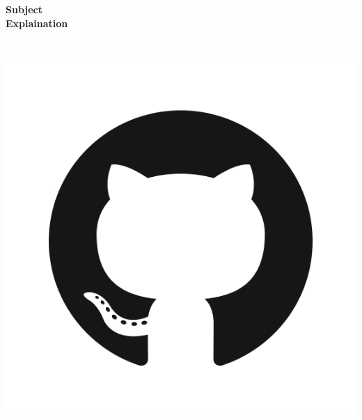 \begin{titlepage}
    \begin{center}

    \textsc{\Large }\\[1.5cm]

    \HRule \\[0.4cm]

    {\huge \bfseries Subject\\
    Explaination\\[0.4cm] }

    \HRule \\[2.7cm]

    \begin{minipage}{.4\textwidth}
        \begin{flushleft}
            \includegraphics[width=\textwidth]{./img/GitHub.png}
        \end{flushleft}
    \end{minipage}~~~~~
    \begin{minipage}{.4\textwidth}
        \begin{flushright}

\end{flushright}
\end{minipage}
\end{center}
\end{titlepage}
